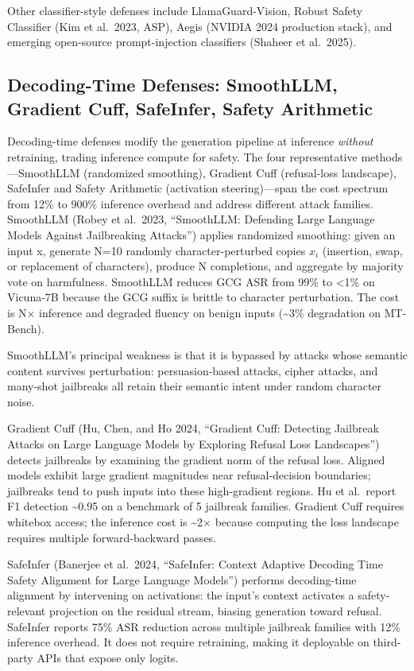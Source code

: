 \documentclass{article}
\begin{document}
Other classifier-style defenses include LlamaGuard-Vision, Robust Safety Classifier (Kim et al.~2023, ASP), Aegis (NVIDIA 2024 production stack), and emerging open-source prompt-injection classifiers (Shaheer et al.~2025).

\subsection{Decoding-Time Defenses: SmoothLLM, Gradient Cuff, SafeInfer, Safety Arithmetic}\label{decoding-time-defenses-smoothllm-gradient-cuff-safeinfer-safety-arithmetic}

Decoding-time defenses modify the generation pipeline at inference \emph{without} retraining, trading inference compute for safety. The four representative methods---SmoothLLM (randomized smoothing), Gradient Cuff (refusal-loss landscape), SafeInfer and Safety Arithmetic (activation steering)---span the cost spectrum from 12\% to 900\% inference overhead and address different attack families. SmoothLLM (Robey et al.~2023, ``SmoothLLM: Defending Large Language Models Against Jailbreaking Attacks'') applies randomized smoothing: given an input x, generate N=10 randomly character-perturbed copies \(x_i\) (insertion, swap, or replacement of characters), produce N completions, and aggregate by majority vote on harmfulness. SmoothLLM reduces GCG ASR from 99\% to \textless1\% on Vicuna-7B because the GCG suffix is brittle to character perturbation. The cost is N× inference and degraded fluency on benign inputs (\textasciitilde3\% degradation on MT-Bench).

SmoothLLM's principal weakness is that it is bypassed by attacks whose semantic content survives perturbation: persuasion-based attacks, cipher attacks, and many-shot jailbreaks all retain their semantic intent under random character noise.

Gradient Cuff (Hu, Chen, and Ho 2024, ``Gradient Cuff: Detecting Jailbreak Attacks on Large Language Models by Exploring Refusal Loss Landscapes'') detects jailbreaks by examining the gradient norm of the refusal loss. Aligned models exhibit large gradient magnitudes near refusal-decision boundaries; jailbreaks tend to push inputs into these high-gradient regions. Hu et al.~report F1 detection \textasciitilde0.95 on a benchmark of 5 jailbreak families. Gradient Cuff requires whitebox access; the inference cost is \textasciitilde2× because computing the loss landscape requires multiple forward-backward passes.

SafeInfer (Banerjee et al.~2024, ``SafeInfer: Context Adaptive Decoding Time Safety Alignment for Large Language Models'') performs decoding-time alignment by intervening on activations: the input's context activates a safety-relevant projection on the residual stream, biasing generation toward refusal. SafeInfer reports 75\% ASR reduction across multiple jailbreak families with 12\% inference overhead. It does not require retraining, making it deployable on third-party APIs that expose only logits.
\end{document}
